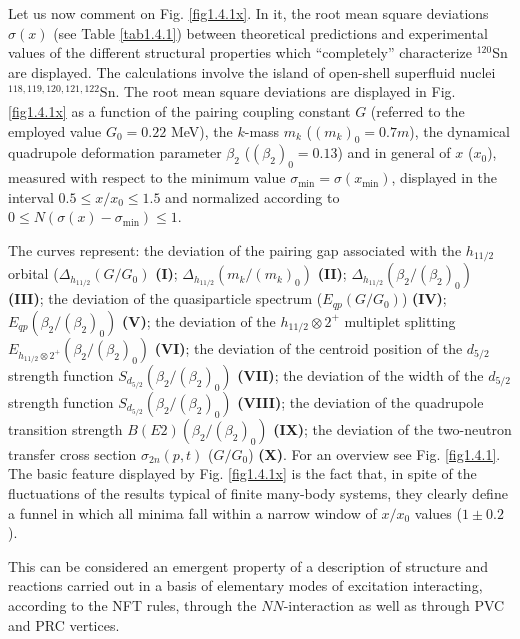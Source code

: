 Let us now  comment on Fig. \ref{fig1.4.1x}. In it, the root mean square deviations $\sigma(x)$ (see Table \ref{tab1.4.1}) between theoretical predictions  and experimental values of the different structural properties which ``completely'' characterize  $^{120}$Sn are displayed. The calculations involve the island of open-shell superfluid nuclei $^{118,119,120,121,122}$Sn. The root mean square deviations are displayed in Fig. \ref{fig1.4.1x} as a function of the pairing coupling constant $G$ (referred to the employed value $G_0 = 0.22$ MeV), the $k$-mass $m_k$ ($(m_k)_0 = 0.7 m$),  the dynamical quadrupole deformation parameter $\beta_2$ ($(\beta_{2})_0 = 0.13$)  and in general of $x$ ($x_0$), measured with respect to the minimum value $\sigma_{\textrm{min}} = \sigma (x_{\textrm{min}})$, displayed in the interval $0.5 \leq x/x_0 \leq 1.5$ and normalized according to $0 \leq N(\sigma(x) - \sigma_{\textrm{min}}) \leq 1$.
 
 
 The  curves represent: the deviation of the  pairing gap associated with the $h_{11/2}$ orbital 
 ($\Delta_{h_{11/2}} (G/G_0)$ \textbf{(I)};  
 $\Delta_{h_{11/2}} (m_k/(m_k)_0)$ \textbf{(II)};  $\Delta_{h_{11/2}} (\beta_{2}/(\beta_{2})_0)$ \textbf{(III)};
 the deviation of the quasiparticle spectrum ($E_{qp}(G/G_0)$) \textbf{(IV)};  $E_{qp}(\beta_{2}/(\beta_{2})_0)$ \textbf{(V)};
 the deviation of the $h_{11/2}\otimes 2^+$ multiplet splitting  $E_{h_{11/2}\otimes 2^+}(\beta_{2}/(\beta_{2})_0)$ \textbf{(VI)}; 
 the deviation of the  centroid position of the $d_{5/2}$ strength function $S_{d_{5/2}}(\beta_{2}/(\beta_{2})_0)$ \textbf{(VII)}; 
 the deviation of the width of the $d_{5/2}$ strength function  $S_{d_{5/2}} (\beta_{2}/(\beta_{2})_0)$ \textbf{(VIII)};
 the deviation  of the  quadrupole transition strength  $B(E2) (\beta_{2}/(\beta_{2})_0)$ \textbf{(IX)}; the deviation of the two-neutron transfer cross section $\sigma_{2n} (p,t)$ ($G/G_0$) \textbf{(X)}. For an overview see Fig. \ref{fig1.4.1}.
 The basic feature displayed by  Fig. \ref{fig1.4.1x} is the fact that, in spite of the fluctuations of the results typical of finite  many-body systems, they clearly define a funnel in which all minima fall within a narrow window of $x/x_0$ values ($1 \pm 0.2$). 
 
 This can be considered  an emergent property of a description of structure and reactions carried out in a basis of elementary modes of excitation interacting, according to the NFT rules, through the $NN$-interaction as well as through PVC and PRC vertices. 
 
